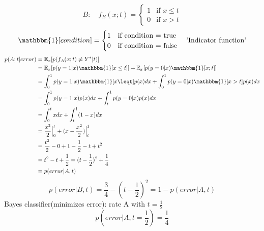 \documentclass[11pt]{article}
\begin{document}
          \begin{equation*}
            B: \quad f_{B}(x;t) = \begin{cases}
            1 & \text{if $x\leq t$} \\
            0 & \text{if $x > t$}
            \end{cases}
          \end{equation*}
          \begin{equation*}
            \mathbbm{1}[condition] = \begin{cases}
              1 & \text{if condition = true} \\
              0 & \text{if condition = false}
            \end{cases}
            \quad \text{'Indicator function'}
          \end{equation*}
          \begin{equation*}
            \begin{align*}
              p(A;t|error) &= \mathbb{E}_{x}[p(f_{A}(x;t) \neq Y^* |t)] \\
              &= \mathbb{E}_{x}[p(y=1|x) \mathbbm{1} [x\leq t]]
              + \mathbb{E}_{x}[p(y=0|x)\mathbbm{1} [x;t]] \\
              &= \int_{0}^{1}p(y=1|x)\mathbbm{1}[x\leqt]p(x)dx
              + \int_{0}^{1}p(y=0|x)\mathbbm{1}[x>t]p(x)dx \\
              &= \int_{0}^{1}p(y=1|x)p(x)dx + \int_{t}^{1}p(y=0|x)p(x)dx \\
              &= \int_{0}^{t}xdx + \int_{t}^{1} (1-x)dx \\
              &= \frac{x^2}{2} \Big |_{0}^{t} + (x-\frac{x^2}{2}) \Big |_{t}^{1} \\
              &= \frac{t^2}{2}-0+1-\frac{1}{2}-t+t^2 \\
              &= t^2 -t + \frac{1}{2} = (t-\frac{1}{2})^2 + \frac{1}{4} \\
              &= p(error|A,t)
            \end{align*}
          \end{equation*}
          \begin{equation*}
            p(error|B,t) = \frac{3}{4} - (t-\frac{1}{2})^2 = 1-p(error|A,t)
          \end{equation*}
          Bayes classifier(minimizes error): rate A with $t=\frac{1}{2}$
          \begin{equation*}
            p(error|A, t=\frac{1}{2}) = \frac{1}{4}
          \end{equation*}
\end{document}
